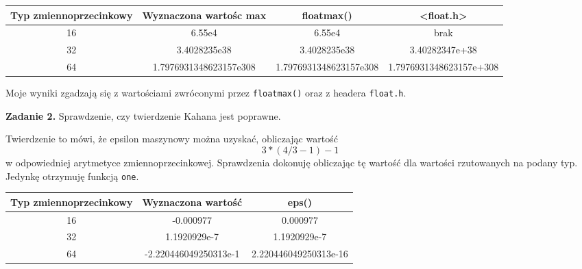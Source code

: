 \documentclass[15pt, a4paper]{article}
\begin{document}
\begin{table}[ht]
    \begin{adjustbox}{max width=\textwidth}
    \begin{tabular}{|c|c|c|c|}
        \hline 
        Typ zmiennoprzecinkowy & Wyznaczona wartośc max & floatmax() & <float.h> \\ \hline
        16 & 6.55e4 & 6.55e4 & brak \\ \hline
        32 & 3.4028235e38 & 3.4028235e38 & 3.40282347e+38 \\ \hline
        64 & 1.7976931348623157e308 & 1.7976931348623157e308 & 1.7976931348623157e+308 \\ \hline
    \end{tabular}
    \end{adjustbox}
    \label{tab:max}
\end{table}

Moje wyniki zgadzają się z wartościami zwróconymi przez \verb|floatmax()| oraz z headera \verb|float.h|.

\vspace{0.5cm}

\noindent\hrulefill


\vspace{0.5cm}

\noindent\textbf{Zadanie 2.} Sprawdzenie, czy twierdzenie Kahana jest poprawne.

\vspace{0.5cm}

Twierdzenie to mówi, że epsilon maszynowy można uzyskać, obliczając wartość \[3 * (4 / 3 - 1) - 1\] w odpowiedniej arytmetyce zmiennoprzecinkowej. Sprawdzenia dokonuję obliczając tę wartość dla wartości rzutowanych na podany typ. Jedynkę otrzymuję funkcją \verb|one|.

\begin{table}[ht]
    \begin{adjustbox}{max width=\textwidth}
    \begin{tabular}{|c|c|c|}
        \hline 
        Typ zmiennoprzecinkowy & Wyznaczona wartość & eps() \\ \hline
        16 & -0.000977 & 0.000977 \\ \hline
        32 & 1.1920929e-7 & 1.1920929e-7 \\ \hline
        64 & -2.220446049250313e-1 & 2.220446049250313e-16 \\ \hline
    \end{tabular}
    \end{adjustbox}
    \label{tab:kahan}
\end{table}
\end{document}
